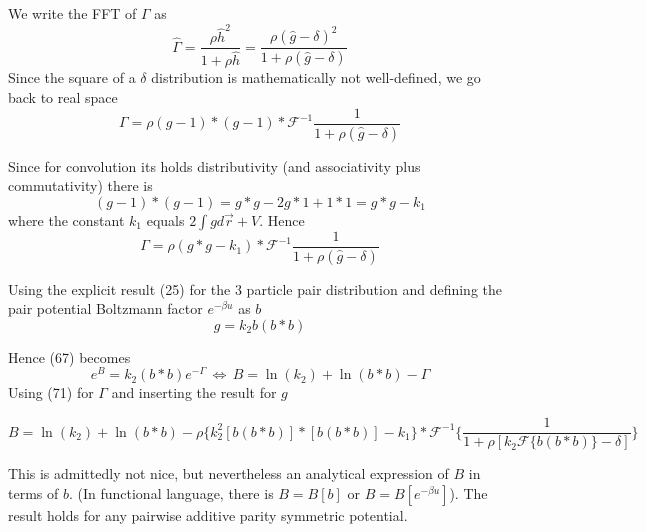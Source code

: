 \documentclass[11pt,a4paper]{article}
\begin{document}
We write the FFT of $\Gamma$ as
\begin{equation}
\hat \Gamma = \frac{\rho \hat h^2}{1 + \rho \hat h}
=
\frac{\rho (\hat g - \delta)^2}{1 + \rho (\hat g - \delta)}
\end{equation}
Since the square of a $\delta$ distribution is mathematically not well-defined, we go back to real space
\begin{equation}
\Gamma =
\rho (g - 1)*(g - 1)*
\mathcal{F}^{-1}\frac{1}{1 + \rho (\hat g - \delta)}
\end{equation}

Since for convolution its holds distributivity (and associativity plus commutativity) there is
\begin{equation}
(g - 1)*(g - 1) = g*g - 2g*1 + 1*1 =
g*g - k_1
\end{equation}
where the constant $k_1$ equals $2 \int g d \vec r + V$. Hence
\begin{equation}
\Gamma =
\rho (g*g - k_1)*
\mathcal{F}^{-1}\frac{1}{1 + \rho (\hat g - \delta)}
\end{equation}


Using the explicit result (25) for the 3 particle pair distribution and defining the pair potential Boltzmann factor 
$e^{-\beta u}$ as $b$
\begin{equation}
g = k_2 b(b*b)
\end{equation}

Hence (67) becomes
\begin{equation}
e^{B} = k_2 (b*b) e^{-\Gamma} \, \Leftrightarrow \,
B = \ln (k_2) + \ln(b*b) - \Gamma
\end{equation}
Using (71) for $\Gamma$ and inserting the result for $g$

\begin{equation}
B = \ln (k_2) + \ln(b*b) - \rho \{ k_2^2 [b(b*b)]*[b(b*b)] - k_1 \}*
\mathcal{F}^{-1} \Big\{
\frac{1}{1 + \rho [k_2 \mathcal{F}\{ b(b*b) \} - \delta]}
\Big\}
\end{equation}

This is admittedly not nice, but nevertheless an analytical expression of $B$ in terms of $b$. (In functional language,
there is $B = B[b]$ or $B = B[e^{-\beta u}]$). The result holds for any pairwise additive parity symmetric potential.

\newpage
\end{document}
